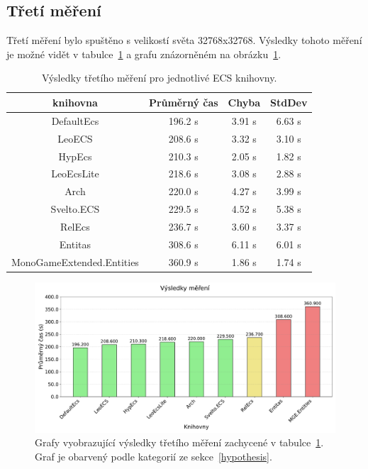 \subsection{Třetí měření}
Třetí měření bylo spuštěno s velikostí světa 32768x32768. Výsledky tohoto měření je možné vidět v tabulce~\ref{tab:third-benchmark-results} a grafu znázorněném na obrázku~\ref{fig:third-benchmark-results}.

\begin{table}[!htb]
    \centering\footnotesize\sf
    \begin{tabular}{c c c c}
        \toprule
        knihovna & Průměrný čas & Chyba & StdDev \\
        \midrule
        DefaultEcs & 196.2 s & 3.91 s & 6.63 s \\
        LeoECS & 208.6 s & 3.32 s & 3.10 s \\
        HypEcs & 210.3 s & 2.05 s & 1.82 s \\
        LeoEcsLite & 218.6 s & 3.08 s & 2.88 s \\
        Arch & 220.0 s & 4.27 s & 3.99 s \\
        Svelto.ECS & 229.5 s & 4.52 s & 5.38 s \\
        RelEcs & 236.7 s & 3.60  s & 3.37 s \\
        Entitas & 308.6 s &6.11 s & 6.01 s \\
        MonoGameExtended.Entities & 360.9 s & 1.86 s & 1.74 s \\
        \bottomrule
    \end{tabular}
    \caption{Výsledky třetího měření pro jednotlivé ECS knihovny.}
    \label{tab:third-benchmark-results}
\end{table}

\begin{figure}[!htb]
    \centering
    \includegraphics[width=1.0\linewidth]{plots/third_benchmark_results.pdf}
    \caption{Grafy vyobrazující výsledky třetího měření zachycené v tabulce~\ref{tab:third-benchmark-results}. Graf je obarvený podle kategorií ze sekce~\ref{hypothesis}.}
    \label{fig:third-benchmark-results}
\end{figure}

